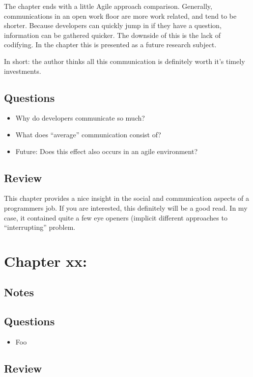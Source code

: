 The chapter ends with a little Agile approach comparison. 
Generally, communications in an open work floor are more work related, and tend to be shorter. 
Because developers can quickly jump in if they have a question, information can be gathered quicker. 
The downside of this is the lack of codifying. 
In the chapter this is presented as a future research subject. 

In short: the author thinks all this communication is definitely worth it's timely investments. 

\subsection{Questions}
\begin{itemize}
  \item Why do developers communicate so much?
  \item What does ``average'' communication consist of?
  \item Future: Does this effect also occurs in an agile environment?
\end{itemize}

\subsection{Review}
This chapter provides a nice insight in the social and communication aspects of a programmers job. 
If you are interested, this definitely will be a good read. 
In my case, it contained quite a few eye openers (implicit different approaches to ``interrupting'' problem. 

\section{Chapter xx: }
\subsection{Notes}

\subsection{Questions}
\begin{itemize}
  \item Foo
\end{itemize}

\subsection{Review}

